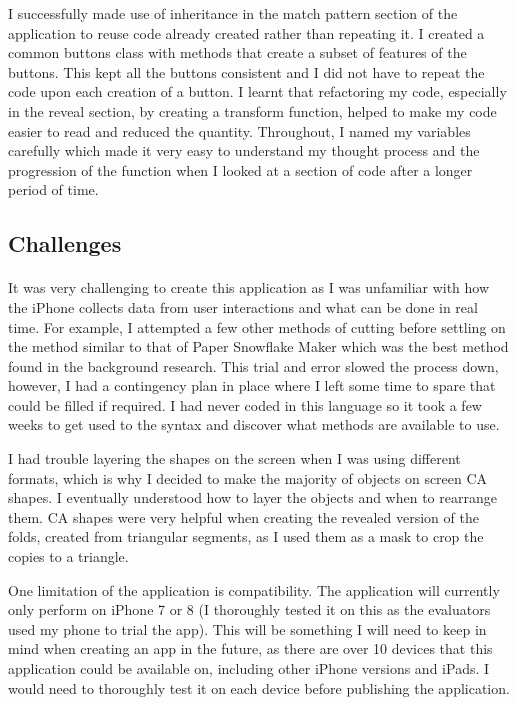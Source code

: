 \documentclass[11pt]{article}
\begin{document}
        I successfully made use of inheritance in the match pattern section of the application to reuse code already created rather than repeating it. I created a common buttons class with methods that create a subset of features of the buttons. This kept all the buttons consistent and I did not have to repeat the code upon each creation of a button. I learnt that refactoring my code, especially in the reveal section, by creating a transform function, helped to make my code easier to read and reduced the quantity. Throughout, I named my variables carefully which made it very easy to understand my thought process and the progression of the function when I looked at a section of code after a longer period of time. 
        
    \subsection{Challenges}
    
        \paragraph{}
        It was very challenging to create this application as I was unfamiliar with how the iPhone collects data from user interactions and what can be done in real time. For example, I attempted a few other methods of cutting before settling on the method similar to that of Paper Snowflake Maker which was the best method found in the background research. This trial and error slowed the process down, however, I had a contingency plan in place where I left some time to spare that could be filled if required. I had never coded in this language so it took a few weeks to get used to the syntax and discover what methods are available to use.
        
        I had trouble layering the shapes on the screen when I was using different formats, which is why I decided to make the majority of objects on screen CA shapes. I eventually understood how to layer the objects and when to rearrange them. CA shapes were very helpful when creating the revealed version of the folds, created from triangular segments, as I used them as a mask to crop the copies to a triangle.
        
        One limitation of the application is compatibility. The application will currently only perform on iPhone 7 or 8 (I thoroughly tested it on this as the evaluators used my phone to trial the app). This will be something I will need to keep in mind when creating an app in the future, as there are over 10 devices that this application could be available on, including other iPhone versions and iPads. I would need to thoroughly test it on each device before publishing the application. 
            
\end{document}
